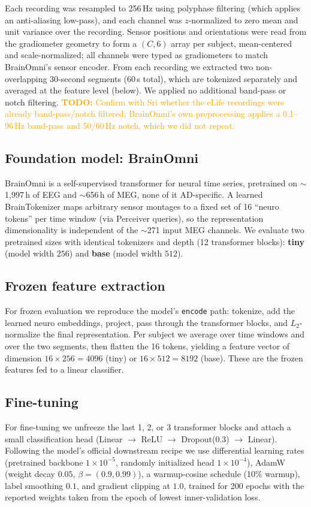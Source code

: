 \documentclass[11pt]{article}
\newcommand{\todo}[1]{\textcolor{orange}{\textbf{TODO:} #1}}
\begin{document}
Each recording was resampled to 256\,Hz using polyphase filtering (which applies an anti-aliasing
low-pass), and each channel was $z$-normalized to zero mean and unit variance over the recording.
Sensor positions and orientations were read from the gradiometer geometry to form a $(C,6)$ array
per subject, mean-centered and scale-normalized; all channels were typed as gradiometers to match
BrainOmni's sensor encoder. From each recording we extracted two non-overlapping 30-second segments
(60\,s total), which are tokenized separately and averaged at the feature level (below). We applied
no additional band-pass or notch filtering.
\todo{Confirm with Sri whether the eLife recordings were already band-pass/notch filtered; BrainOmni's
own preprocessing applies a 0.1--96\,Hz band-pass and 50/60\,Hz notch, which we did not repeat.}

\subsection{Foundation model: BrainOmni}
BrainOmni is a self-supervised transformer for neural time series, pretrained on
$\sim$1{,}997\,h of EEG and $\sim$656\,h of MEG, none of it AD-specific. A learned BrainTokenizer
maps arbitrary sensor montages to a fixed set of 16 ``neuro tokens'' per time window (via Perceiver
queries), so the representation dimensionality is independent of the $\sim$271 input MEG channels.
We evaluate two pretrained sizes with identical tokenizers and depth (12 transformer blocks):
\textbf{tiny} (model width $256$) and \textbf{base} (model width $512$).

\subsection{Frozen feature extraction}
For frozen evaluation we reproduce the model's \texttt{encode} path: tokenize, add the learned
neuro embeddings, project, pass through the transformer blocks, and $L_2$-normalize the final
representation. Per subject we average over time windows and over the two segments, then flatten the
16 tokens, yielding a feature vector of dimension $16\times256=4096$ (tiny) or $16\times512=8192$
(base). These are the frozen features fed to a linear classifier.

\subsection{Fine-tuning}
For fine-tuning we unfreeze the last 1, 2, or 3 transformer blocks and attach a small classification
head (Linear $\rightarrow$ ReLU $\rightarrow$ Dropout(0.3) $\rightarrow$ Linear). Following the
model's official downstream recipe we use differential learning rates (pretrained backbone
$1\times10^{-5}$, randomly initialized head $1\times10^{-4}$), AdamW (weight decay $0.05$,
$\beta=(0.9,0.99)$), a warmup-cosine schedule (10\% warmup), label smoothing $0.1$, and gradient
clipping at $1.0$, trained for 200 epochs with the reported weights taken from the epoch of lowest
inner-validation loss.
\end{document}
